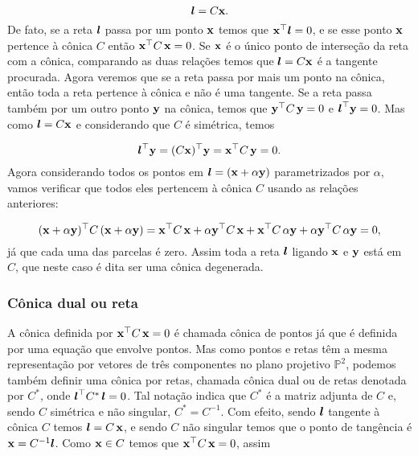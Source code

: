 \begin{equation*}
\boldsymbol{l}=C\mathbf{x}.
\end{equation*}
De fato, se a reta $\boldsymbol{l}$ passa por um ponto $\mathbf{x}$ temos que $\mathbf{x}^\top\boldsymbol{l}=0$, e se esse ponto $\mathbf{x}$ pertence à cônica $C$ então $\mathbf{x}^\top C\,\mathbf{x}=0$. Se $\mathbf{x}$ é o único ponto de interseção da reta com a cônica, comparando as duas relações  temos que $\boldsymbol{l}=C\mathbf{x}$ é a tangente procurada. Agora veremos que se a reta passa por mais um ponto na cônica, então toda a reta pertence à cônica e não é uma tangente.
Se a reta passa também por um outro ponto ${\bf y}$ na cônica, temos que ${\bf y}^\top C\,{\bf y}=0$ e $\boldsymbol{l}^\top{\bf y}=0$. Mas como $\boldsymbol{l}=C\mathbf{x}$ e considerando que $C$ é simétrica, temos

\begin{equation*}
\boldsymbol{l}^\top{\bf y}=(C\mathbf{x})^\top{\bf y}=\mathbf{x}^\top C\,{\bf y}=0.
\end{equation*}  
Agora considerando todos os pontos em $\boldsymbol{l}=(\mathbf{x}+\alpha{\bf y})$ parametrizados por $\alpha$, vamos verificar que todos eles pertencem à cônica $C$ usando as relações anteriores:

\begin{equation*}
(\mathbf{x}+\alpha{\bf y})^\top C\,(\mathbf{x}+\alpha{\bf y})=\mathbf{x}^\top C\,\mathbf{x}+\alpha{\bf y}^\top C\,\mathbf{x}+\mathbf{x}^\top C\,\alpha{\bf y}+\alpha{\bf y}^\top C\,\alpha{\bf y}=0,
\end{equation*}
já que cada uma das parcelas é zero. Assim toda a reta $\boldsymbol{l}$ ligando $\mathbf{x}$ e ${\bf y}$ está em $C$, que neste caso é dita ser uma cônica degenerada.\\

\subsubsection{Cônica dual ou reta}\label{sec.conica-dual} 

A cônica definida por $\mathbf{x}^\top C\,\mathbf{x}=0$ é chamada cônica de pontos já que é definida por uma equação que envolve pontos. Mas como pontos e retas têm a mesma representação por vetores de três componentes no plano projetivo $\mathbb{P}^2$, podemos também definir uma cônica por retas, chamada cônica dual ou de retas denotada por $C^*$, onde $\boldsymbol{l}^\top C^*\,\boldsymbol{l}=0$. Tal notação indica que $C^*$ é a matriz adjunta de $C$ e, sendo $C$ simétrica e não singular, $C^*=C^{-1}$. Com efeito, sendo $\boldsymbol{l}$ tangente à cônica $C$ temos $\boldsymbol{l}=C\,\mathbf{x}$, e sendo $C$ não singular temos que o ponto de tangência é $\mathbf{x}=C^{-1}\boldsymbol{l}$. Como $\mathbf{x}\in C$ temos que $\mathbf{x}^\top C\,\mathbf{x}=0$, assim

